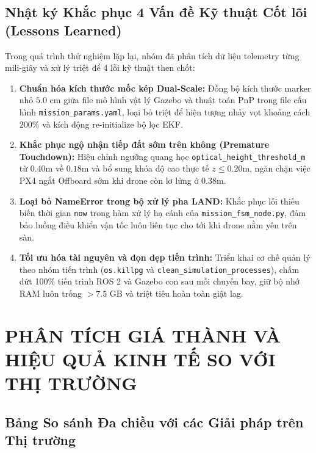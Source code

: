 \documentclass[12pt,a4paper]{article}
\begin{document}
\subsection{Nhật ký Khắc phục 4 Vấn đề Kỹ thuật Cốt lõi (Lessons Learned)}
Trong quá trình thử nghiệm lặp lại, nhóm đã phân tích dữ liệu telemetry từng mili-giây và xử lý triệt để 4 lỗi kỹ thuật then chốt:
\begin{enumerate}[noitemsep,topsep=2pt]
    \item \textbf{Chuẩn hóa kích thước mốc kép Dual-Scale:} Đồng bộ kích thước marker nhỏ $5.0\text{ cm}$ giữa file mô hình vật lý Gazebo và thuật toán PnP trong file cấu hình \texttt{mission\_params.yaml}, loại bỏ triệt để hiện tượng nhảy vọt khoảng cách $200\%$ và kích động re-initialize bộ lọc EKF.
    \item \textbf{Khắc phục ngộ nhận tiếp đất sớm trên không (Premature Touchdown):} Hiệu chỉnh ngưỡng quang học \texttt{optical\_height\_threshold\_m} từ $0.40\text{m}$ về $0.18\text{m}$ và bổ sung khóa độ cao thực tế $z \le 0.20\text{m}$, ngăn chặn việc PX4 ngắt Offboard sớm khi drone còn lơ lửng ở $0.38\text{m}$.
    \item \textbf{Loại bỏ NameError trong bộ xử lý pha LAND:} Khắc phục lỗi thiếu biến thời gian \texttt{now} trong hàm xử lý hạ cánh của \texttt{mission\_fsm\_node.py}, đảm bảo luồng điều khiển vận tốc luôn liên tục cho tới khi drone nằm yên trên sàn.
    \item \textbf{Tối ưu hóa tài nguyên và dọn dẹp tiến trình:} Triển khai cơ chế quản lý theo nhóm tiến trình (\texttt{os.killpg} và \texttt{clean\_simulation\_processes}), chấm dứt 100\% tiến trình ROS 2 và Gazebo con sau mỗi chuyến bay, giữ bộ nhớ RAM luôn trống $> 7.5\text{ GB}$ và triệt tiêu hoàn toàn giật lag.
\end{enumerate}

\section{PHÂN TÍCH GIÁ THÀNH VÀ HIỆU QUẢ KINH TẾ SO VỚI THỊ TRƯỜNG}

\subsection{Bảng So sánh Đa chiều với các Giải pháp trên Thị trường}
\end{document}

